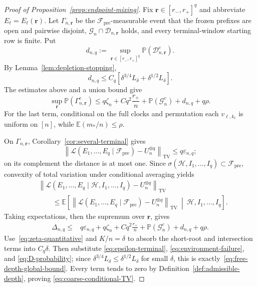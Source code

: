 \documentclass[11pt]{article}
\newcommand{\E}{\mathbb E}
\newcommand{\Pp}{\mathbb P}
\newcommand{\1}{\mathbf 1}
\newcommand{\TV}{\mathrm{TV}}
\newcommand{\cF}{\mathcal F}
\newcommand{\cG}{\mathcal G}
\newcommand{\cH}{\mathcal H}
\newcommand{\cD}{\mathcal D}
\newcommand{\cL}{\mathcal L}
\newcommand{\eps}{\varepsilon}
\theoremstyle{definition}
\theoremstyle{remark}
\begin{document}
\begin{proof}[Proof of Proposition~\ref{prop:endpoint-mixing}]
Fix $\mathbf r\in[r_-,r_+]^q$ and abbreviate
$E_\ell=E_\ell(\mathbf r)$.  Let $\Gamma_{n,\mathbf r}$ be the
$\cF_{\mathrm{pre}}$-measurable event that the frozen prefixes are open
and pairwise disjoint, $\cG_n\cap\cD_{n,\mathbf r}$ holds, and every terminal-window
starting row is finite.  Put
\[
 d_{n,q}:=\sup_{\mathbf r\in[r_-,r_+]^q}\Pp(\cD_{n,\mathbf r}^c).
\]
By Lemma~\ref{lem:depletion-stopping},
\[
 d_{n,q}\le C_q\left[
 \delta^{3/4}L_\delta
 +\delta^{1/2}L_\delta
 \right].
\]
The estimates above and a union bound give
\begin{equation}\label{eq:good-prefix-complement}
 \sup_{\mathbf r}\Pp(\Gamma_{n,\mathbf r}^c)
 \leq q\zeta_n+Cq^2\frac{r_+}{n}
      +\Pp(\cG_n^c)+d_{n,q}+q\rho.
\end{equation}
For the last term, conditional on the full clocks and permutation each
$v_{\ell,k_\ell}$ is uniform on $[n]$, while
$\E(m_*/n)\leq\rho$.

On $\Gamma_{n,\mathbf r}$, Corollary~\ref{cor:several-terminal} gives
\[
 \left\|
  \cL(E_1,\dots,E_q\mid\cF_{\mathrm{pre}})-U_n^{\otimes q}
 \right\|_{\TV}
 \leq q\eps_{n,q};
\]
on its complement the distance is at most one.  Since
$\sigma(\cH,I_1,\dots,I_q)\subset\cF_{\mathrm{pre}}$, convexity of total
variation under conditional averaging yields
\begin{align*}
 &\left\|
  \cL(E_1,\dots,E_q\mid\cH,I_1,\dots,I_q)-U_n^{\otimes q}
 \right\|_{\TV}\\
 &\qquad\leq
 \E\left[
  \left\|
   \cL(E_1,\dots,E_q\mid\cF_{\mathrm{pre}})-U_n^{\otimes q}
  \right\|_{\TV}
  \ \middle|\ \cH,I_1,\dots,I_q
 \right].
\end{align*}
Taking expectations, then the supremum over $\mathbf r$, gives
\begin{align}
 \Delta_{n,q}\leq{}&q\eps_{n,q}+q\zeta_n
 +Cq^2\frac{r_+}{n}+\Pp(\cG_n^c)+d_{n,q}+q\rho.
 \label{eq:endpoint-TV-global-error}
\end{align}
Use~\eqref{eq:zeta-quantitative} and $K/n=\delta$ to absorb the
short-root and intersection terms into $C_q\delta$.  Then substitute
\eqref{eq:epsilon-terminal}, \eqref{eq:environment-failure}, and
\eqref{eq:D-probability}; since
$\delta^{3/4}L_\delta\le\delta^{1/2}L_\delta$ for small $\delta$, this
is exactly~\eqref{eq:free-depth-global-bound}.  Every term tends to zero
by Definition~\ref{def:admissible-depth}, proving
\eqref{eq:coarse-conditional-TV}.
\end{proof}
\end{document}

